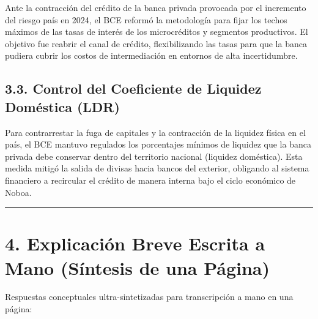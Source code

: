 \documentclass[12pt,spanish]{article}
\begin{document}
Ante la contracción del crédito de la banca privada provocada por el
incremento del riesgo país en 2024, el BCE reformó la metodología para
fijar los techos máximos de las tasas de interés de los microcréditos y
segmentos productivos. El objetivo fue reabrir el canal de crédito,
flexibilizando las tasas para que la banca pudiera cubrir los costos de
intermediación en entornos de alta incertidumbre.

\subsection{3.3. Control del Coeficiente de Liquidez Doméstica
(LDR)}\label{control-del-coeficiente-de-liquidez-domuxe9stica-ldr}

Para contrarrestar la fuga de capitales y la contracción de la liquidez
física en el país, el BCE mantuvo regulados los porcentajes mínimos de
liquidez que la banca privada debe conservar dentro del territorio
nacional (liquidez doméstica). Esta medida mitigó la salida de divisas
hacia bancos del exterior, obligando al sistema financiero a recircular
el crédito de manera interna bajo el ciclo económico de Noboa.

\begin{center}\rule{0.5\linewidth}{0.5pt}\end{center}

\section{4. Explicación Breve Escrita a Mano (Síntesis de una
Página)}\label{explicaciuxf3n-breve-escrita-a-mano-suxedntesis-de-una-puxe1gina}

Respuestas conceptuales ultra-sintetizadas para transcripción a mano en
una página:
\end{document}
